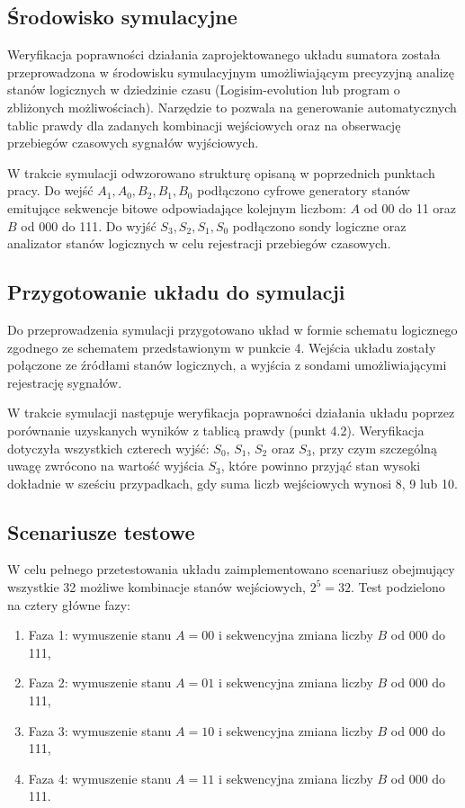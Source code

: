 \documentclass[11pt]{article}
\begin{document}
\subsection{Środowisko symulacyjne}

Weryfikacja poprawności działania zaprojektowanego układu sumatora została przeprowadzona w środowisku symulacyjnym umożliwiającym precyzyjną analizę stanów logicznych w dziedzinie czasu (Logisim-evolution lub program o zbliżonych możliwościach). Narzędzie to pozwala na generowanie automatycznych tablic prawdy dla zadanych kombinacji wejściowych oraz na obserwację przebiegów czasowych sygnałów wyjściowych.

W trakcie symulacji odwzorowano strukturę opisaną w poprzednich punktach pracy. Do wejść \(A_1, A_0, B_2, B_1, B_0\) podłączono cyfrowe generatory stanów emitujące sekwencje bitowe odpowiadające kolejnym liczbom: \(A\) od 00 do 11 oraz \(B\) od 000 do 111. Do wyjść \(S_3, S_2, S_1, S_0\) podłączono sondy logiczne oraz analizator stanów logicznych w celu rejestracji przebiegów czasowych.

\subsection{Przygotowanie układu do symulacji}

Do przeprowadzenia symulacji przygotowano układ w formie schematu logicznego zgodnego ze schematem przedstawionym w punkcie 4. Wejścia układu zostały połączone ze źródłami stanów logicznych, a wyjścia z sondami umożliwiającymi rejestrację sygnałów.

W trakcie symulacji następuje weryfikacja poprawności działania układu poprzez porównanie uzyskanych wyników z tablicą prawdy (punkt 4.2). Weryfikacja dotyczyła wszystkich czterech wyjść: \(S_0\), \(S_1\), \(S_2\) oraz \(S_3\), przy czym szczególną uwagę zwrócono na wartość wyjścia \(S_3\), które powinno przyjąć stan wysoki dokładnie w sześciu przypadkach, gdy suma liczb wejściowych wynosi 8, 9 lub 10.

\subsection{Scenariusze testowe}

W celu pełnego przetestowania układu zaimplementowano scenariusz obejmujący wszystkie 32 możliwe kombinacje stanów wejściowych, \(2^5 = 32\). Test podzielono na cztery główne fazy:
\begin{enumerate}
    \item Faza 1: wymuszenie stanu \(A = 00\) i sekwencyjna zmiana liczby \(B\) od 000 do 111,
    \item Faza 2: wymuszenie stanu \(A = 01\) i sekwencyjna zmiana liczby \(B\) od 000 do 111,
    \item Faza 3: wymuszenie stanu \(A = 10\) i sekwencyjna zmiana liczby \(B\) od 000 do 111,
    \item Faza 4: wymuszenie stanu \(A = 11\) i sekwencyjna zmiana liczby \(B\) od 000 do 111.
\end{enumerate}
\end{document}
